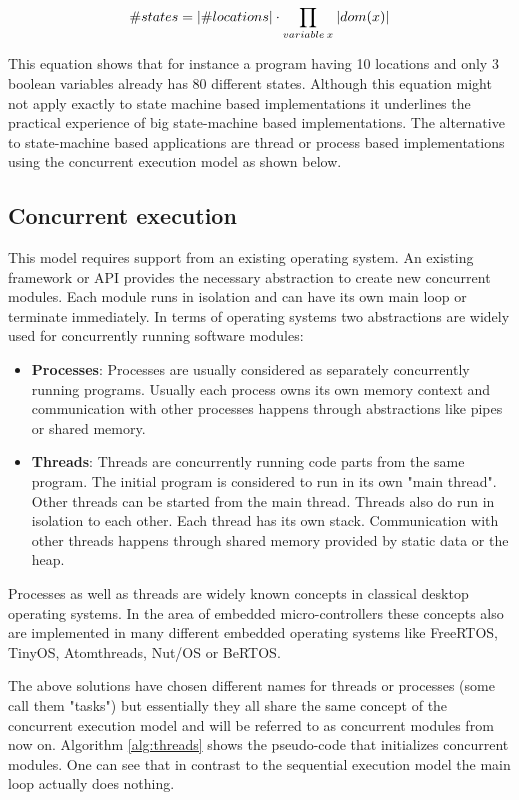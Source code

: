 \begin{equation}
\label{eq:state explosion}
\#states = \lvert\#locations\rvert \cdot \prod_{variable \: x} \: \lvert dom(x)\rvert
\end{equation}

This equation shows that for instance a program having 10 locations and only 3 boolean variables already has 80 different states. Although this equation might not apply exactly to state machine based implementations it underlines the practical experience of big state-machine based implementations. The alternative to state-machine based applications are thread or process based implementations using the concurrent execution model as shown below.

\subsection{Concurrent execution}%
This model requires support from an existing operating system. An existing framework or API provides the necessary abstraction to create new concurrent modules. Each module runs in isolation and can have its own main loop or terminate immediately. In terms of operating systems two abstractions are widely used for concurrently running software modules:

\begin{itemize}
    \item \textbf{Processes}: Processes are usually considered as separately concurrently running programs. Usually each process owns its own memory context and communication with other processes happens through abstractions like pipes or shared memory.
    \item \textbf{Threads}: Threads are concurrently running code parts from the same program. The initial program is considered to run in its own "main thread". Other threads can be started from the main thread. Threads also do run in isolation to each other. Each thread has its own stack. Communication with other threads happens through shared memory provided by static data or the heap.
\end{itemize}

Processes as well as threads are widely known concepts in classical desktop operating systems. In the area of embedded micro-controllers these concepts also are implemented in many different embedded operating systems like FreeRTOS, TinyOS, Atomthreads, Nut/OS or BeRTOS.

The above solutions have chosen different names for threads or processes (some call them "tasks") but essentially they all share the same concept of the concurrent execution model and will be referred to as concurrent modules from now on. Algorithm \ref{alg:threads} shows the pseudo-code that initializes concurrent modules. One can see that in contrast to the sequential execution model the main loop actually does nothing.


